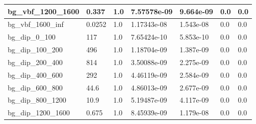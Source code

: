 \documentclass[a4paper, 10pt]{article}
\begin{document}
\begin{table}[H]
\begin{center}
\begin{tabular}{|m{23.0mm}|m{23.0mm}|m{18.0mm}|m{19.0mm}|m{19.0mm}|m{19.0mm}|m{19.0mm}|}
      \hline
      {\cellcolor{white}         bg\_vbf\_1200\_1600}& {\cellcolor{white}         0.337}& {\cellcolor{white}         1.0}& {\cellcolor{white}         7.57578e-09}& {\cellcolor{white}         9.664e-09}& {\cellcolor{green}         0.0}& {\cellcolor{green}         0.0}\\
      \hline
      {\cellcolor{white}         bg\_vbf\_1600\_inf}& {\cellcolor{white}         0.0252}& {\cellcolor{white}         1.0}& {\cellcolor{white}         1.17343e-08}& {\cellcolor{white}         1.543e-08}& {\cellcolor{green}         0.0}& {\cellcolor{green}         0.0}\\
      \hline
      {\cellcolor{white}         bg\_dip\_0\_100}& {\cellcolor{white}         117}& {\cellcolor{white}         1.0}& {\cellcolor{white}         7.65424e-10}& {\cellcolor{white}         5.853e-10}& {\cellcolor{green}         0.0}& {\cellcolor{green}         0.0}\\
      \hline
      {\cellcolor{white}         bg\_dip\_100\_200}& {\cellcolor{white}         496}& {\cellcolor{white}         1.0}& {\cellcolor{white}         1.18704e-09}& {\cellcolor{white}         1.387e-09}& {\cellcolor{green}         0.0}& {\cellcolor{green}         0.0}\\
      \hline
      {\cellcolor{white}         bg\_dip\_200\_400}& {\cellcolor{white}         814}& {\cellcolor{white}         1.0}& {\cellcolor{white}         3.50088e-09}& {\cellcolor{white}         2.275e-09}& {\cellcolor{green}         0.0}& {\cellcolor{green}         0.0}\\
      \hline
      {\cellcolor{white}         bg\_dip\_400\_600}& {\cellcolor{white}         292}& {\cellcolor{white}         1.0}& {\cellcolor{white}         4.46119e-09}& {\cellcolor{white}         2.584e-09}& {\cellcolor{green}         0.0}& {\cellcolor{green}         0.0}\\
      \hline
      {\cellcolor{white}         bg\_dip\_600\_800}& {\cellcolor{white}         44.6}& {\cellcolor{white}         1.0}& {\cellcolor{white}         4.86013e-09}& {\cellcolor{white}         2.677e-09}& {\cellcolor{green}         0.0}& {\cellcolor{green}         0.0}\\
      \hline
      {\cellcolor{white}         bg\_dip\_800\_1200}& {\cellcolor{white}         10.9}& {\cellcolor{white}         1.0}& {\cellcolor{white}         5.19487e-09}& {\cellcolor{white}         4.117e-09}& {\cellcolor{green}         0.0}& {\cellcolor{green}         0.0}\\
      \hline
      {\cellcolor{white}         bg\_dip\_1200\_1600}& {\cellcolor{white}         0.675}& {\cellcolor{white}         1.0}& {\cellcolor{white}         8.45939e-09}& {\cellcolor{white}         1.179e-08}& {\cellcolor{green}         0.0}& {\cellcolor{green}         0.0}\\

\end{tabular}
\end{center}
\end{table}
\end{document}
